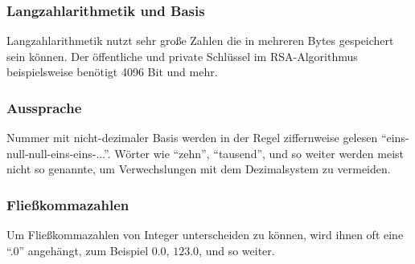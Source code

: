 \subsubsection{Langzahlarithmetik und Basis}
Langzahlarithmetik nutzt sehr große Zahlen die in mehreren Bytes gespeichert sein können. Der öffentliche und private
Schlüssel im RSA-Algorithmus beispielsweise benötigt 4096 Bit und mehr.
\DEph{}

\subsubsection{Aussprache}
Nummer mit nicht-dezimaler Basis werden in der Regel ziffernweise gelesen ``eins-null-null-eins-eins-...''.
Wörter wie ``zehn'', ``tausend'', und so weiter werden meist nicht so genannte, um Verwechslungen mit dem
Dezimalsystem zu vermeiden.

\subsubsection{Fließkommazahlen}
Um Fließkommazahlen von Integer unterscheiden zu können, wird ihnen oft eine ``.0'' angehängt,
zum Beispiel $0.0$, $123.0$, und so weiter.

